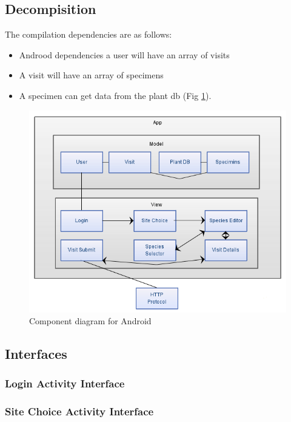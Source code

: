 \subsection{Decompisition}
	The compilation dependencies are as follows:
	\begin{itemize}
		\item Androod dependencies a user will have an array of visits
		\item A visit will have an array of specimens
		\item A specimen can get data from the plant db (Fig \ref{fig:androidComponentDiagram}).
	\end{itemize}
	
	\begin{figure}
		\centering
			\includegraphics[scale=0.75]{android/componentDiagram.png}
		\caption{Component diagram for Android}
		\label{fig:androidComponentDiagram}
	\end{figure}

\newpage
\subsection{Interfaces}
	\subsubsection{Login Activity Interface}
		

	\newpage
	\subsubsection{Site Choice Activity Interface}
		

